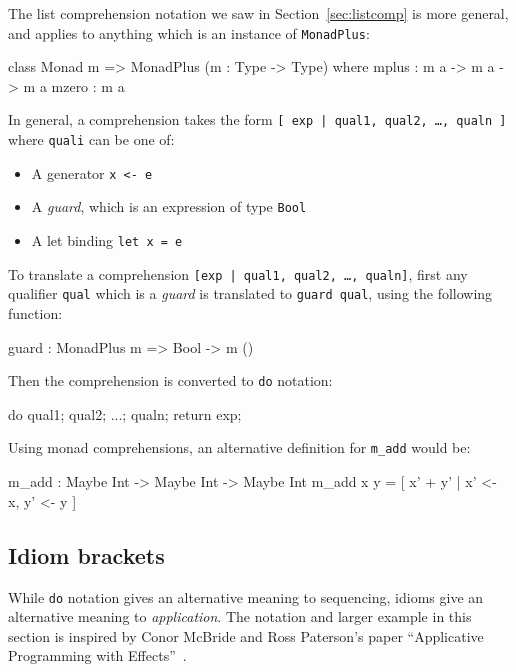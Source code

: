 The list comprehension notation we saw in Section~\ref{sec:listcomp} is more general, and applies to anything which is an instance of \texttt{MonadPlus}:

\begin{code}
class Monad m => MonadPlus (m : Type -> Type) where
    mplus : m a -> m a -> m a
    mzero : m a
\end{code}

\noindent
In general, a comprehension takes the form \texttt{[ exp | qual1, qual2, \ldots, qualn ]} where \texttt{quali} can be one of:

\begin{itemize}
\item A generator \texttt{x <- e}
\item A \emph{guard}, which is an expression of type \texttt{Bool}
\item A let binding \texttt{let x = e}
\end{itemize}

\noindent
To translate a comprehension \texttt{[exp | qual1, qual2, \ldots, qualn]}, first any qualifier \texttt{qual} which is a \emph{guard} is translated to \texttt{guard qual}, using the following function:

\begin{code}
guard : MonadPlus m => Bool -> m ()
\end{code} 

\noindent
Then the comprehension is converted to \texttt{do} notation:

\begin{code}
do { qual1; qual2; ...; qualn; return exp; }
\end{code} 

\noindent
Using monad comprehensions, an alternative definition for \texttt{m\_add} would be:

\begin{code}
m_add : Maybe Int -> Maybe Int -> Maybe Int
m_add x y = [ x' + y' | x' <- x, y' <- y ]
\end{code} 

\subsection{Idiom brackets}

While \texttt{do} notation gives an alternative meaning to sequencing, idioms give an alternative meaning to \emph{application}.
The notation and larger example in this section is inspired by Conor McBride and Ross Paterson's paper ``Applicative
Programming with Effects''~\cite{idioms}.


